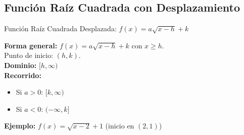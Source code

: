 \documentclass[12pt,a4paper]{article}
\begin{document}
\subsection{Función Raíz Cuadrada con Desplazamiento}
\begin{funcbox}{Función Raíz Cuadrada Desplazada: $f(x)=a\sqrt{x-h}+k$}
\begin{minipage}[t]{0.55\textwidth}
    \textbf{Forma general:} $f(x)=a\sqrt{x-h}+k$ con $x\ge h$.\\
    Punto de inicio: $(h,k)$.\\
    \textbf{Dominio:} $[h,\infty)$\\
    \textbf{Recorrido:}
    \begin{itemize}
        \item Si $a>0$: $[k,\infty)$
        \item Si $a<0$: $(-\infty,k]$
    \end{itemize}
    \textbf{Ejemplo:} $f(x)=\sqrt{x-2}+1$ (inicio en $(2,1)$)
\end{minipage}\hfill
\begin{minipage}[t]{0.4\textwidth}
    \centering
\end{minipage}
\end{funcbox}

\end{document}
